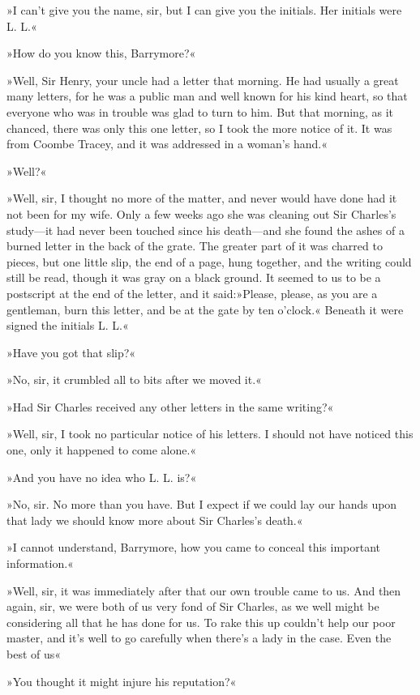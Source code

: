 »I can't give you the name, sir, but I can give you the initials. Her initials were L. L.«

»How do you know this, Barrymore?«

»Well, Sir Henry, your uncle had a letter that morning. He had usually a great many letters, for he was a public man and well known for his kind heart, so that everyone who was in trouble was glad to turn to him. But that morning, as it chanced, there was only this one letter, so I took the more notice of it. It was from Coombe Tracey, and it was addressed in a woman's hand.«

»Well?«


»Well, sir, I thought no more of the matter, and never would have done had it not been for my wife. Only a few weeks ago she was cleaning out Sir Charles's study—it had never been touched since his death—and she found the ashes of a burned letter in the back of the grate. The greater part of it was charred to pieces, but one little slip, the end of a page, hung together, and the writing could still be read, though it was gray on a black ground. It seemed to us to be a postscript at the end of the letter, and it said:»Please, please, as you are a gentleman, burn this letter, and be at the gate by ten o'clock.« Beneath it were signed the initials L. L.«

»Have you got that slip?«

»No, sir, it crumbled all to bits after we moved it.«

»Had Sir Charles received any other letters in the same writing?«

»Well, sir, I took no particular notice of his letters. I should not have noticed this one, only it happened to come alone.«

»And you have no idea who L. L. is?«

»No, sir. No more than you have. But I expect if we could lay our hands upon that lady we should know more about Sir Charles's death.«

»I cannot understand, Barrymore, how you came to conceal this important information.«

»Well, sir, it was immediately after that our own trouble came to us. And then again, sir, we were both of us very fond of Sir Charles, as we well might be considering all that he has done for us. To rake this up couldn't help our poor master, and it's well to go carefully when there's a lady in the case. Even the best of us\longdash«

»You thought it might injure his reputation?«


